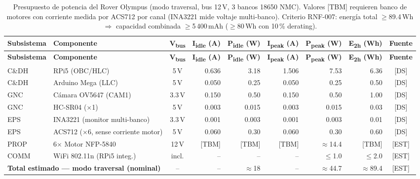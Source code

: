 \begin{landscape}
\centering
\scriptsize
\setlength{\tabcolsep}{3pt}
\renewcommand{\arraystretch}{1.3}
\begin{longtable}{| p{2.0cm} | p{4.5cm} | c | r | r | r | r | r | c |}
\caption{Presupuesto de potencia del Rover Olympus (modo traversal, bus 12\,V, 3 bancos 18650 NMC).
  Valores [TBM] requieren banco de motores con corriente medida por ACS712 por canal (INA3221 mide voltaje multi-banco). Criterio RNF-007: energía total $\ge$89.4\,Wh
  $\Rightarrow$ capacidad combinada $\ge$5\,400\,mAh ($\ge$80\,Wh con 10\,\% derating).}
\label{tab:power_budget}\\
\hline
\textbf{Subsistema} & \textbf{Componente} & \textbf{V\textsubscript{bus}} &
\textbf{I\textsubscript{idle} (A)} & \textbf{P\textsubscript{idle} (W)} &
\textbf{I\textsubscript{peak} (A)} & \textbf{P\textsubscript{peak} (W)} &
\textbf{E\textsubscript{2h} (Wh)} & \textbf{Fuente} \\ \hline
\endfirsthead
\hline
\textbf{Subsistema} & \textbf{Componente} & \textbf{V\textsubscript{bus}} &
\textbf{I\textsubscript{idle} (A)} & \textbf{P\textsubscript{idle} (W)} &
\textbf{I\textsubscript{peak} (A)} & \textbf{P\textsubscript{peak} (W)} &
\textbf{E\textsubscript{2h} (Wh)} & \textbf{Fuente} \\ \hline
\endhead
\hline
\endfoot
\hline
\endlastfoot

C\&DH  & RPi5 (OBC/HLC)         & 5\,V  & 0.636 & 3.18  & 1.506 & 7.53  & 6.36  & [DS] \cite{rpi5_brief} \\ \hline
C\&DH  & Arduino Mega (LLC)      & 5\,V  & 0.050 & 0.25  & 0.050 & 0.25  & 0.50  & [DS] \cite{arduino_mega_ds} \\ \hline
GNC    & Cámara OV5647 (CAM1)    & 3.3\,V & 0.150 & 0.50  & 0.150 & 0.50  & 1.00  & [DS] \\ \hline
GNC    & HC-SR04 ($\times$1)     & 5\,V  & 0.003 & 0.015 & 0.003 & 0.015 & 0.03  & [DS] \\ \hline
EPS    & INA3221 (monitor multi-banco) & 3.3\,V & 0.001 & 0.003 & 0.001 & 0.003 & 0.01 & [DS] \\ \hline
EPS    & ACS712 ($\times$6, sense corriente motor) & 5\,V & 0.060 & 0.30 & 0.060 & 0.30 & 0.60 & [DS] \\ \hline
PROP   & 6$\times$ Motor NFP-5840 & 12\,V & {[TBM]} & {[TBM]} & {[TBM]} & $\approx$14.4 & {[TBM]} & [EST] \\ \hline
COMM   & WiFi 802.11n (RPi5 integ.) & incl. & -- & -- & -- & $\le$1.0 & $\le$2.0 & [EST] \\ \hline
\hline
\multicolumn{2}{|l|}{\textbf{Total estimado — modo traversal (nominal)}}
  & --    & --    & $\approx$18   & --    & $\approx$44.7 & $\approx$89.4 & [EST] \\ \hline

\end{longtable}
\end{landscape}

